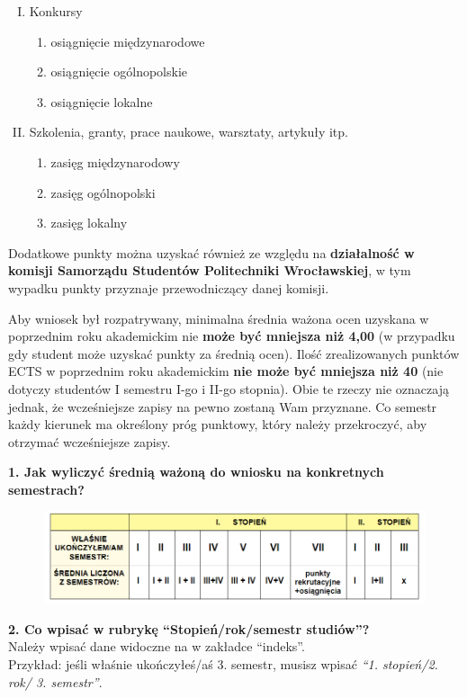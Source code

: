 \documentclass[11pt]{article}
\begin{document}
\begin{enumerate}[I.]
    \item Konkursy
        \begin{enumerate}
            \item osiągnięcie międzynarodowe 
            \item osiągnięcie ogólnopolskie 
            \item osiągnięcie lokalne
        \end{enumerate}
    \item Szkolenia, granty, prace naukowe, warsztaty, artykuły itp. 
        \begin{enumerate}
            \item zasięg międzynarodowy 
            \item zasięg ogólnopolski 
            \item zasięg lokalny
        \end{enumerate}
\end{enumerate}
Dodatkowe punkty można uzyskać również ze względu na \textbf{działalność w komisji Samorządu Studentów Politechniki Wrocławskiej}, w tym wypadku punkty przyznaje przewodniczący danej komisji. 

\indent \hspace{0.5cm} Aby wniosek był rozpatrywany, minimalna średnia ważona ocen uzyskana w
poprzednim roku akademickim nie \textbf{może być mniejsza niż 4,00} (w przypadku gdy student może uzyskać punkty za średnią ocen). Ilość zrealizowanych punktów ECTS w poprzednim roku akademickim \textbf{nie może być mniejsza niż 40} (nie dotyczy studentów I semestru I-go i II-go stopnia). Obie te rzeczy nie oznaczają jednak, że wcześniejsze zapisy na pewno zostaną Wam przyznane. Co semestr każdy kierunek ma określony próg punktowy, który należy przekroczyć, aby otrzymać wcześniejsze zapisy. 

\textbf{1. Jak wyliczyć średnią ważoną do wniosku na konkretnych semestrach?}
\begin{figure}[H]
    \centering
    \includegraphics[width=\linewidth]{wczezapisy.png}
\end{figure}

\textbf{2. Co wpisać w rubrykę “Stopień/rok/semestr studiów”?}\\
Należy wpisać dane widoczne na {} w zakładce “indeks”.\\ Przykład: jeśli właśnie ukończyłeś/aś 3. semestr, musisz wpisać \textit{“1. stopień/2. rok/ 3. semestr”}.
\end{document}
